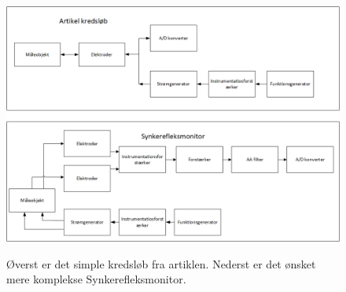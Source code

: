 \begin{figure}[H]
\centering
{\includegraphics[width=\linewidth]
{Figure/konklusiondiagram}}
\caption{Øverst er det simple kredsløb fra artiklen. Nederst er det ønsket mere komplekse Synkerefleksmonitor.}
\label{fig:konklusiondiagram}
\end{figure}













